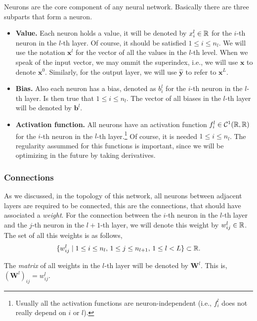 Neurons are the core component of any neural network. Basically there are three
subparts that form a neuron.
\begin{itemize}
  \item \textbf{Value.} Each neuron holds a value, it will be denoted by
  \(x_i^l \in \mathbb{R}\) for the \(i\)-th neuron in the \(l\)-th layer. Of course, it
  should be satisfied \(1 \leq i \leq n_l\). We will use the notation
  \(\mathbf{x}^l\) for the vector of all the values in the \(l\)-th level. When
  we speak of the input vector, we may ommit the superindex, i.e., we will use
  \(\mathbf{x}\) to denote \(\mathbf{x}^0\). Similarly, for the output layer,
  we will use \(\mathbf{\hat{y}}\) to refer to \(\mathbf{x}^L\).
  \item \textbf{Bias.} Also each neuron has a bias, denoted as \(b_i^l\) for
  the \(i\)-th neuron in the \(l\)-th layer. Is then true that
  \(1 \leq i \leq n_l\). The vector of all biases in the \(l\)-th layer will be
  denoted by \(\mathbf{b}^l\).
  \item \textbf{Activation function.} All neurons have an activation function
  \(f_i ^ l \in \mathcal{C} ^ 1 (\mathbb{R}, \mathbb{R})\) for the \(i\)-th neuron in the
  \(l\)-th layer.\footnote{Usually all the activation functions are
    neuron-independent (i.e., \(f_i^l\) does not really depend on \(i\) or
    \(l\)).} Of course, it is needed \(1 \leq i \leq n_l\). The regularity
  assummed for this functions is important, since we will be optimizing in the
  future by taking derivatives.
\end{itemize}

\subsubsection{Connections}

As we discussed, in the topology of this network, all neurons between adjacent
layers are required to be connected, this are the connections, that should have
associated a \emph{weight}. For the connection between the \(i\)-th neuron in
the \(l\)-th layer and the \(j\)-th neuron in the \(l + 1\)-th layer, we will
denote this weight by \(w_{ij}^l \in \mathbb{R}\). The set of all this weights is as
follows,
\begin{equation}
  \{w_{ij}^l \mid 1 \leq i \leq n_{l}, \, 1 \leq j \leq n_{l+1}, \,
  1 \leq l < L \} \subset \mathbb{R}.
\end{equation}

The \emph{matrix} of all weights in the \(l\)-th layer will be denoted by
\(\mathbf{W}^l\). This is, \((\mathbf{W}^l)_{ij} = w_{ij}^ l\).

